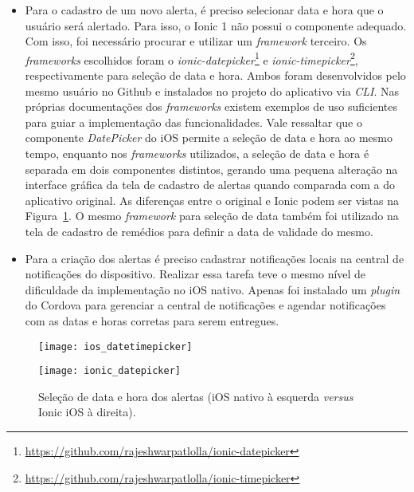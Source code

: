 \begin{itemize}
	\begin{itemize}
		\item Para o cadastro de um novo alerta, é preciso selecionar data e hora que o usuário será alertado. Para isso, o Ionic 1 não possui o componente adequado. Com isso, foi necessário procurar 
		e utilizar um \textit{framework} terceiro. Os \textit{frameworks} escolhidos foram o \textit{ionic-datepicker}\footnote{\url{https://github.com/rajeshwarpatlolla/ionic-datepicker}} e 
		\textit{ionic-timepicker}\footnote{\url{https://github.com/rajeshwarpatlolla/ionic-timepicker}}, respectivamente para seleção de data e hora. Ambos foram desenvolvidos pelo mesmo usuário no Github 
		e instalados no projeto do aplicativo via \textit{CLI}. Nas próprias documentações dos \textit{frameworks} existem exemplos de uso suficientes para guiar a implementação das funcionalidades. 
		Vale ressaltar que o componente \textit{DatePicker} do iOS permite a seleção de data e hora ao mesmo tempo, enquanto nos \textit{frameworks} utilizados, a seleção de data e hora é separada em dois componentes distintos, 
		gerando uma pequena alteração na interface gráfica da tela de cadastro de alertas quando comparada com a do aplicativo original. As diferenças entre o original e Ionic podem ser vistas na 
		Figura~\ref{fig:dateTimePicker}. O mesmo \textit{framework} para seleção de data também foi utilizado na tela de cadastro de remédios para definir a data de validade do mesmo.

		\item Para a criação dos alertas é preciso cadastrar notificações locais na central de notificações do dispositivo. Realizar essa tarefa teve o mesmo nível de dificuldade da implementação no iOS nativo. 
		Apenas foi instalado um \textit{plugin} do Cordova para gerenciar a central de notificações e agendar notificações com as datas e horas corretas para serem entregues. 
	\end{itemize}

	\begin{figure}[H]
		\centering
		\begin{minipage}{.33\textwidth}
			\centering
			\texttt{[image: ios\_datetimepicker]}
		\end{minipage}%
		\begin{minipage}{.33\textwidth}
			\centering
			\texttt{[image: ionic\_datepicker]}
		\end{minipage}
	\caption[Seleção de data e hora dos alertas (iOS \textit{versus} Ionic)]{ Seleção de data e hora dos alertas (iOS nativo à esquerda \textit{versus} Ionic iOS à direita).}
	\label{fig:dateTimePicker}
	\end{figure}
 	

\end{itemize}
